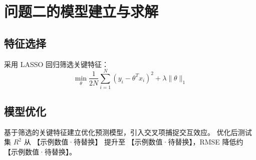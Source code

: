 \section{问题二的模型建立与求解}

\subsection{特征选择}

采用 LASSO 回归筛选关键特征：
\[
  \min_{\theta} \frac{1}{2N} \sum_{i=1}^{N} (y_i - \theta^T x_i)^2 + \lambda \|\theta\|_1
\]

\subsection{模型优化}

基于筛选的关键特征建立优化预测模型，引入交叉项捕捉交互效应。
优化后测试集 $R^2$ 从 【示例数值·待替换】 提升至 【示例数值·待替换】，RMSE 降低约 【示例数值·待替换】。
